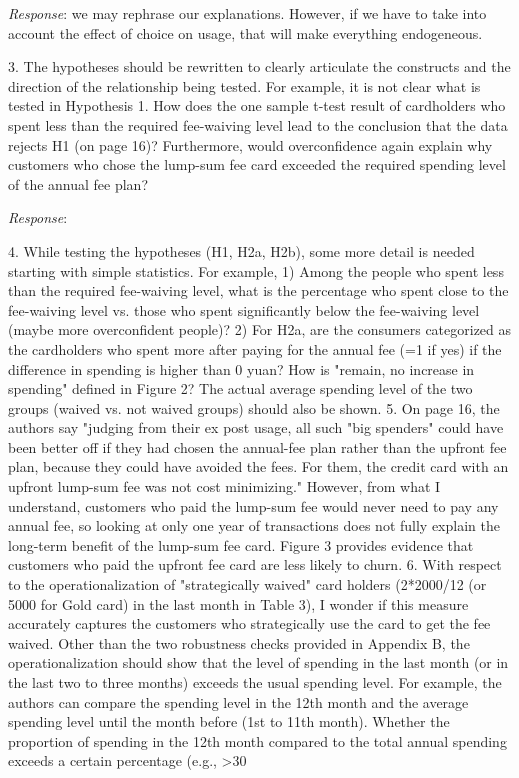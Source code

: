 \documentclass[titlepage,12pt,letterpaper]{article}
\numberwithin{equation}{section}
\begin{document}
\emph{Response}: we may rephrase our explanations. However, if we have to take into account the effect of choice on usage, that will make everything endogeneous. 

3. 	The hypotheses should be rewritten to clearly articulate the constructs and the direction of the relationship being tested. For example, it is not clear what is tested in Hypothesis 1. How does the one sample t-test result of cardholders who spent less than the required fee-waiving level lead to the conclusion that the data rejects H1 (on page 16)? Furthermore, would overconfidence again explain why customers who chose the lump-sum fee card exceeded the required spending level of the annual fee plan?

\emph{Response}: 

4. 	While testing the hypotheses (H1, H2a, H2b), some more detail is needed starting with simple statistics. For example,
1) 	Among the people who spent less than the required fee-waiving level, what is the percentage who spent close to the fee-waiving level vs. those who spent significantly below the fee-waiving level (maybe more overconfident people)?
2) 	For H2a, are the consumers categorized as the cardholders who spent more after paying for the annual fee (=1 if yes) if the difference in spending is higher than 0 yuan? How is "remain, no increase in spending" defined in Figure 2? The actual average spending level of the two groups (waived vs. not waived groups) should also be shown.
5. 	On page 16, the authors say "judging from their ex post usage, all such "big spenders" could have been better off if they had chosen the annual-fee plan rather than the upfront fee plan, because they could have avoided the fees. For them, the credit card with an upfront lump-sum fee was not cost minimizing." However, from what I understand, customers who paid the lump-sum fee would never need to pay any annual fee, so looking at only one year of transactions does not fully explain the long-term benefit of the lump-sum fee card. Figure 3 provides evidence that customers who paid the upfront fee card are less likely to churn.
6. 	With respect to the operationalization of "strategically waived" card holders (2*2000/12 (or 5000 for Gold card) in the last month in Table 3), I wonder if this measure accurately captures the customers who strategically use the card to get the fee waived. Other than the two robustness checks provided in Appendix B, the operationalization should show that the level of spending in the last month (or in the last two to three months) exceeds the usual spending level. For example, the authors can compare the spending level in the 12th month and the average spending level until the month before (1st to 11th month). Whether the proportion of spending in the 12th month compared to the total annual spending exceeds a certain percentage (e.g., >30%
\end{document}
